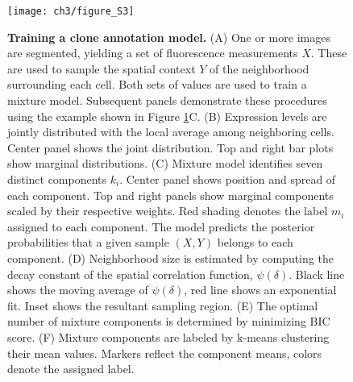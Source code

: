 \begin{figure}[h]
\texttt{[image: ch3/figure\_S3]}
\caption[Training a clone annotation model.]{\textbf{Training a clone annotation model.} (A) One or more images are segmented, yielding a set of fluorescence measurements $X$. These are used to sample the spatial context $Y$ of the neighborhood surrounding each cell. Both sets of values are used to train a mixture model. Subsequent panels demonstrate these procedures using the example shown in Figure \ref{fig:ch3:figS3}C. (B) Expression levels are jointly distributed with the local average among neighboring cells. Center panel shows the joint distribution. Top and right bar plots show marginal distributions. (C) Mixture model identifies seven distinct components $k_i$. Center panel shows position and spread of each component. Top and right panels show marginal components scaled by their respective weights. Red shading denotes the label $m_i$ assigned to each component. The model predicts the posterior probabilities that a given sample $(X,Y)$ belongs to each component. (D) Neighborhood size is estimated by computing the decay constant of the spatial correlation function, $\psi(\delta)$. Black line shows the moving average of $\psi(\delta)$, red line shows an exponential fit. Inset shows the resultant sampling region. (E) The optimal number of mixture components is determined by minimizing BIC score. (F) Mixture components are labeled by k-means clustering their mean values. Markers reflect the component means, colors denote the assigned label.}
\label{fig:ch3:figS3}
\end{figure}

